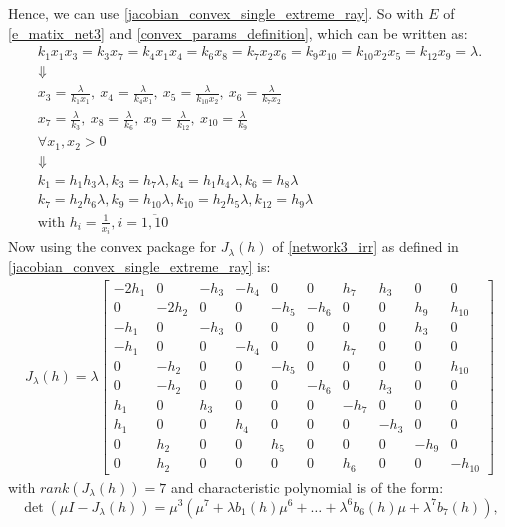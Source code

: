 Hence, we can use \ref{jacobian_convex_single_extreme_ray}. So with $E$ of \ref{e_matix_net3} and \ref{convex_params_definition}, which can be written as:
\begin{gather*}
	k_1x_1x_3=k_3x_7=k_4x_1x_4=k_6x_8=k_7x_2x_6=k_9x_{10}=k_{10}x_2x_5=k_{12}x_9=\lambda. \\
	\Downarrow \\
	x_{3} = \frac{\lambda}{k_{1} x_{1}}, \ x_{4} = \frac{\lambda}{k_{4} x_{1}}, \ x_{5} = \frac{\lambda}{k_{10} x_{2}}, \ x_{6} = \frac{\lambda}{k_{7} x_{2}} \\
	x_{7} = \frac{\lambda}{k_{3}}, \ x_{8} = \frac{\lambda}{k_{6}}, \ x_{9} = \frac{\lambda}{k_{12}}, \ x_{10} = \frac{\lambda}{k_{9}} \\
	\forall x_1, x_2 > 0 \\
	\Downarrow \\
	k_{1} = h_{1} h_{3} \lambda, k_{3} = h_{7} \lambda, k_{4} = h_{1} h_{4} \lambda, k_{6} = h_{8} \lambda \\
	k_{7} = h_{2} h_{6} \lambda, k_{9} = h_{10} \lambda, k_{10} = h_{2} h_{5} \lambda, k_{12} = h_{9} \lambda \\
	\text{with } h_i = \frac{1}{x_i} , i = \overline{1,10}
\end{gather*}
Now using the convex package \cite{franz2016ConvexMaple} for $J_\lambda(h)$ of \ref{network3_irr} as defined in \ref{jacobian_convex_single_extreme_ray} is:
\begin{align}
	J_\lambda(h) = \lambda
	\left.\left[
		\begin{array}{rrrrrrrrrr}-2h_{1}&0&-h_{3}&-h_{4}&0&0&h_{7}&h_{3}&0&0\\0&-2h_{2}&0&0&-h_{5}&-h_{6}&0&0&h_{9}&h_{10}\\-h_{1}&0&-h_{3}&0&0&0&0&0&h_{3}&0\\-h_{1}&0&0&-h_{4}&0&0&h_{7}&0&0&0\\0&-h_{2}&0&0&-h_{5}&0&0&0&0&h_{10}\\0&-h_{2}&0&0&0&-h_{6}&0&h_{3}&0&0\\h_{1}&0&h_{3}&0&0&0&-h_{7}&0&0&0\\h_{1}&0&0&h_{4}&0&0&0&-h_{3}&0&0\\0&h_{2}&0&0&h_{5}&0&0&0&-h_{9}&0\\0&h_{2}&0&0&0&0&h_{6}&0&0&-h_{10}
	\end{array}\right.\right]
\end{align}
with $rank(J_\lambda(h)) = 7$ and characteristic polynomial is of the form:
\[
	\det\left(\mu I-J_\lambda(h)\right)=\mu^3\left(\mu^7+\lambda b_1(h)\mu^6+\ldots+\lambda^6b_6(h)\mu+\lambda^7b_7(h)\right),
\]
